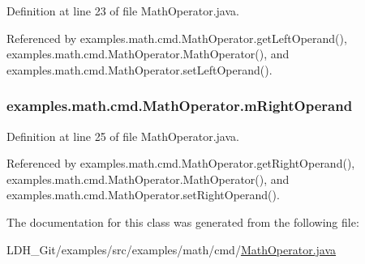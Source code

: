 Definition at line 23 of file Math\-Operator.\-java.



Referenced by examples.\-math.\-cmd.\-Math\-Operator.\-get\-Left\-Operand(), examples.\-math.\-cmd.\-Math\-Operator.\-Math\-Operator(), and examples.\-math.\-cmd.\-Math\-Operator.\-set\-Left\-Operand().

\hypertarget{classexamples_1_1math_1_1cmd_1_1_math_operator_ac903d7a31eade46a6015321bfd34bb1c}{
\subsubsection[{m\-Right\-Operand}]{ examples.\-math.\-cmd.\-Math\-Operator.\-m\-Right\-Operand\hspace{0.3cm}{\ttfamily [private]}}}\label{classexamples_1_1math_1_1cmd_1_1_math_operator_ac903d7a31eade46a6015321bfd34bb1c}


Definition at line 25 of file Math\-Operator.\-java.



Referenced by examples.\-math.\-cmd.\-Math\-Operator.\-get\-Right\-Operand(), examples.\-math.\-cmd.\-Math\-Operator.\-Math\-Operator(), and examples.\-math.\-cmd.\-Math\-Operator.\-set\-Right\-Operand().



The documentation for this class was generated from the following file\-:\begin{DoxyCompactItemize}
\item 
L\-D\-H\-\_\-\-Git/examples/src/examples/math/cmd/\hyperlink{_math_operator_8java}{Math\-Operator.\-java}\end{DoxyCompactItemize}
